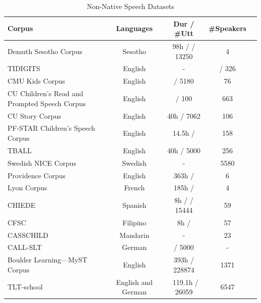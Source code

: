 \begin{table}[htbp]
  \centering
  \setlength{\tabcolsep}{7pt} %
  \renewcommand{\arraystretch}{1.5} %
  \begin{tabular}{p{6cm}cccc}
  
    \toprule
    Corpus & Languages & Dur / \#Utt & \#Speakers   \\
    \midrule
    \midrule
    Demuth Sesotho Corpus \cite{demuth1992acquisition} & Sesotho & 98h / / 13250 & 4 \\    \midrule
    TIDIGITS \cite{tidigits} & English & - & / 326 \\    \midrule
    CMU Kids Corpus \cite{cmu} & English & / 5180 & 76 \\    \midrule



    CU Children's Read and Prompted Speech Corpus \cite{cu_children} & English &  / 100 & 663 \\\midrule
    CU Story Corpus \cite{cu_children} & English & 40h / 7062 & 106\\    \midrule
    PF-STAR Children's Speech Corpus \cite{pfstar} & English & 14.5h /  & 158 \\    \midrule

    TBALL \cite{tball} & English & 40h / 5000 & 256 \\    \midrule

    Swedish NICE Corpus \cite{swedish} & Swedish & - & 5580\\    \midrule
    Providence Corpus \cite{providence_corpus} & English & 363h /  & 6 \\    \midrule

    Lyon Corpus \cite{lyon} & French & 185h /  & 4 \\ \midrule
    CHIEDE \cite{chiede} & Spanish & 8h /  / 15444 & 59 \\    \midrule

    CFSC \cite{CFSC} & Filipino & 8h / & 57  \\
    \midrule
    CASS\-CHILD \cite{casschild} & Mandarin & - & 23 \\    \midrule
    CALL-SLT \cite{callslt} & German & / 5000 & - \\\midrule
    Boulder Learning—MyST Corpus \cite{boulder} & English & 393h / 228874 & 1371\\    \midrule
    TLT-school \cite{tlt} & English and German & ~119.1h / 26059 & 6547 \\
    \midrule
    \midrule
  \end{tabular}
  \newline
    \caption{Non-Native Speech Datasets}
    \label{tab:non-native}

\end{table}



